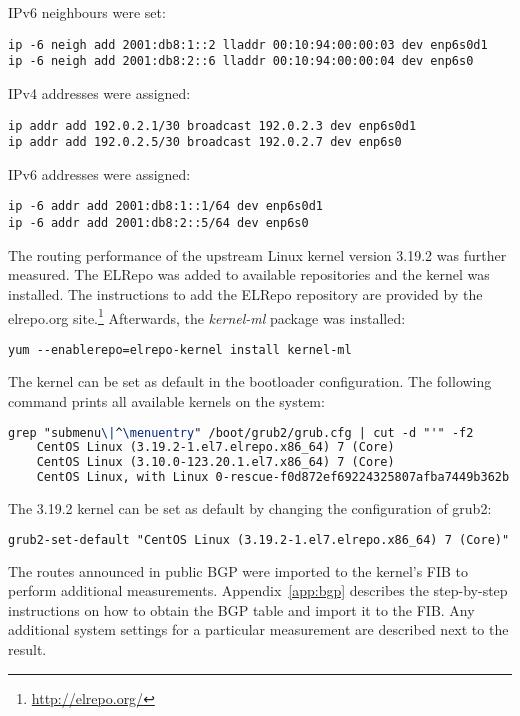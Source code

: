 IPv6 neighbours were set:
\begin{lstlisting}
ip -6 neigh add 2001:db8:1::2 lladdr 00:10:94:00:00:03 dev enp6s0d1
ip -6 neigh add 2001:db8:2::6 lladdr 00:10:94:00:00:04 dev enp6s0
\end{lstlisting}
IPv4 addresses were assigned:
\begin{lstlisting}
ip addr add 192.0.2.1/30 broadcast 192.0.2.3 dev enp6s0d1
ip addr add 192.0.2.5/30 broadcast 192.0.2.7 dev enp6s0
\end{lstlisting}
IPv6 addresses were assigned:
\begin{lstlisting}
ip -6 addr add 2001:db8:1::1/64 dev enp6s0d1
ip -6 addr add 2001:db8:2::5/64 dev enp6s0
\end{lstlisting}

The routing performance of the upstream Linux kernel version 3.19.2 was further measured.
The ELRepo was added to available repositories and the kernel was installed.
The instructions to add the ELRepo repository are provided by the elrepo.org site.\footnote{\url{http://elrepo.org/}}
Afterwards, the {\it{kernel-ml}} package was installed:
\begin{lstlisting}
yum --enablerepo=elrepo-kernel install kernel-ml
\end{lstlisting}
The kernel can be set as default in the bootloader configuration.
The following command prints all available kernels on the system:
\begin{lstlisting}[language=TeX]
grep "submenu\|^\menuentry" /boot/grub2/grub.cfg | cut -d "'" -f2
    CentOS Linux (3.19.2-1.el7.elrepo.x86_64) 7 (Core)
    CentOS Linux (3.10.0-123.20.1.el7.x86_64) 7 (Core)
    CentOS Linux, with Linux 0-rescue-f0d872ef69224325807afba7449b362b
\end{lstlisting}
The 3.19.2 kernel can be set as default by changing the configuration of grub2:
\begin{lstlisting}[language=TeX]
grub2-set-default "CentOS Linux (3.19.2-1.el7.elrepo.x86_64) 7 (Core)"
\end{lstlisting}

The routes announced in public BGP were imported to the kernel's FIB to perform additional measurements.
Appendix~\ref{app:bgp} describes the step-by-step instructions on how to obtain the BGP table and import it to the FIB.
Any additional system settings for a particular measurement are described next to the result.
